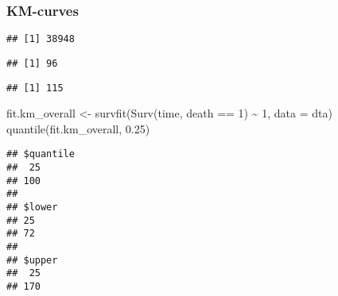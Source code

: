 \documentclass[
]{article}
\newenvironment{Shaded}{\begin{snugshade}}{\end{snugshade}}
\newcommand{\AttributeTok}[1]{\textcolor[rgb]{0.77,0.63,0.00}{#1}}
\newcommand{\CommentTok}[1]{\textcolor[rgb]{0.56,0.35,0.01}{\textit{#1}}}
\newcommand{\DecValTok}[1]{\textcolor[rgb]{0.00,0.00,0.81}{#1}}
\newcommand{\FloatTok}[1]{\textcolor[rgb]{0.00,0.00,0.81}{#1}}
\newcommand{\FunctionTok}[1]{\textcolor[rgb]{0.00,0.00,0.00}{#1}}
\newcommand{\NormalTok}[1]{#1}
\newcommand{\OtherTok}[1]{\textcolor[rgb]{0.56,0.35,0.01}{#1}}
\newcommand{\SpecialCharTok}[1]{\textcolor[rgb]{0.00,0.00,0.00}{#1}}
\begin{document}
\hypertarget{km-curves}{%
\subsubsection{KM-curves}\label{km-curves}}

\begin{Shaded}
\end{Shaded}

\begin{verbatim}
## [1] 38948
\end{verbatim}

\begin{Shaded}
\end{Shaded}

\begin{verbatim}
## [1] 96
\end{verbatim}

\begin{Shaded}
\end{Shaded}

\begin{verbatim}
## [1] 115
\end{verbatim}

\begin{Shaded}
\begin{Highlighting}[]
\NormalTok{fit.km\_overall }\OtherTok{\textless{}{-}} \FunctionTok{survfit}\NormalTok{(}\FunctionTok{Surv}\NormalTok{(time, death }\SpecialCharTok{==} \DecValTok{1}\NormalTok{) }\SpecialCharTok{\textasciitilde{}} \DecValTok{1}\NormalTok{, }\AttributeTok{data =}\NormalTok{ dta)}
\FunctionTok{quantile}\NormalTok{(fit.km\_overall, }\FloatTok{0.25}\NormalTok{)}
\end{Highlighting}
\end{Shaded}

\begin{verbatim}
## $quantile
##  25 
## 100 
## 
## $lower
## 25 
## 72 
## 
## $upper
##  25 
## 170
\end{verbatim}
\end{document}
